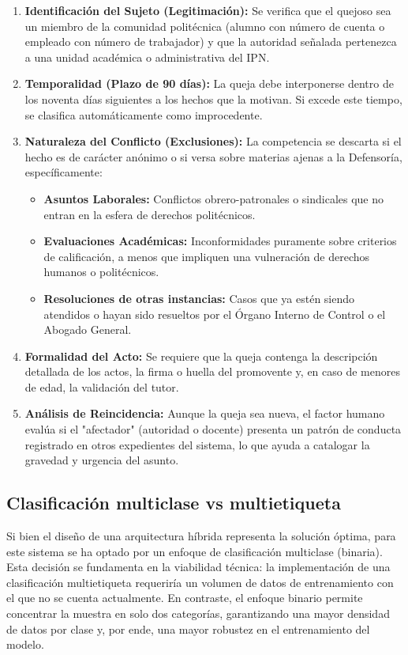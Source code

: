\begin{enumerate}
    \item \textbf{Identificación del Sujeto (Legitimación):} Se verifica que el quejoso sea un miembro de la comunidad politécnica (alumno con número de cuenta o empleado con número de trabajador) y que la autoridad señalada pertenezca a una unidad académica o administrativa del IPN.
    \item \textbf{Temporalidad (Plazo de 90 días):} La queja debe interponerse dentro de los noventa días siguientes a los hechos que la motivan. Si excede este tiempo, se clasifica automáticamente como improcedente.
    \item \textbf{Naturaleza del Conflicto (Exclusiones):} La competencia se descarta si el hecho es de carácter anónimo o si versa sobre materias ajenas a la Defensoría, específicamente:
    \begin{itemize}
        \item[3.1.] \textbf{Asuntos Laborales:} Conflictos obrero-patronales o sindicales que no entran en la esfera de derechos politécnicos.
        \item[3.2.] \textbf{Evaluaciones Académicas:} Inconformidades puramente sobre criterios de calificación, a menos que impliquen una vulneración de derechos humanos o politécnicos.
        \item[3.3.] \textbf{Resoluciones de otras instancias:} Casos que ya estén siendo atendidos o hayan sido resueltos por el Órgano Interno de Control o el Abogado General.
    \end{itemize}
    \item \textbf{Formalidad del Acto:} Se requiere que la queja contenga la descripción detallada de los actos, la firma o huella del promovente y, en caso de menores de edad, la validación del tutor.
    \item \textbf{Análisis de Reincidencia:} Aunque la queja sea nueva, el factor humano evalúa si el "afectador" (autoridad o docente) presenta un patrón de conducta registrado en otros expedientes del sistema, lo que ayuda a catalogar la gravedad y urgencia del asunto.
\end{enumerate}

\subsection{Clasificación multiclase vs multietiqueta}

Si bien el diseño de una arquitectura híbrida representa la solución óptima, para este sistema se ha optado por un enfoque de clasificación multiclase (binaria). Esta decisión se fundamenta en la viabilidad técnica: la implementación de una clasificación multietiqueta requeriría un volumen de datos de entrenamiento con el que no se cuenta actualmente. En contraste, el enfoque binario permite concentrar la muestra en solo dos categorías, garantizando una mayor densidad de datos por clase y, por ende, una mayor robustez en el entrenamiento del modelo.

